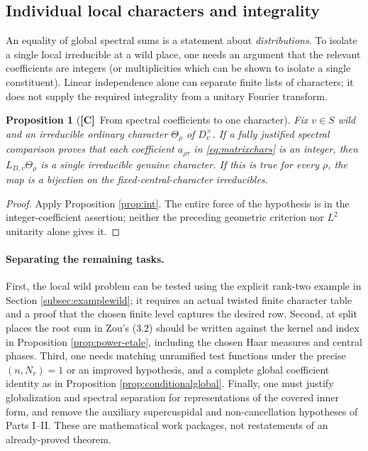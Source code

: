 \documentclass[11pt]{article}
\newcommand{\Ctag}{\textnormal{\textbf{[C]}}}
\theoremstyle{plain}
\newtheorem{proposition}[theorem]{Proposition}
\theoremstyle{definition}
\begin{document}
\subsection{Individual local characters and integrality}
An equality of global spectral sums is a statement about
\emph{distributions}.  To isolate a single local irreducible at a
wild place, one needs an argument that the relevant coefficients
are integers (or multiplicities which can be shown to isolate a
single constituent).  Linear independence alone can separate
finite lists of characters; it does not supply the required
integrality from a unitary Fourier transform.

\begin{proposition}[\Ctag\ From spectral coefficients to one character]
Fix $v\in S$ wild and an irreducible ordinary character
$\Theta_\rho$ of $D_v^\times$.  If a fully justified spectral
comparison proves that each coefficient $a_{\rho\tau}$ in
\eqref{eq:matrixchars} is an integer, then
$L_{D,v}\Theta_\rho$ is a single irreducible genuine character.
If this is true for every $\rho$, the map is a bijection on the
fixed-central-character irreducibles.
\end{proposition}
\begin{proof}
Apply Proposition \ref{prop:int}.  The entire force of the
hypothesis is in the integer-coefficient assertion; neither the
preceding geometric criterion nor $L^2$ unitarity alone gives it.
\end{proof}

\paragraph{Separating the remaining tasks.}
First, the local wild problem can be tested using the explicit
rank-two example in Section \ref{subsec:examplewild}; it requires
an actual twisted finite character table and a proof that the
chosen finite level captures the desired row.  Second, at split
places the root sum in Zou's (3.2) should be written against the
kernel and index in Proposition \ref{prop:power-etale}, including
the chosen Haar measures and central phases.  Third, one needs
matching unramified test functions under the precise
$(n,N_r)=1$ or an improved hypothesis, and a complete global
coefficient identity as in Proposition \ref{prop:conditionalglobal}.
Finally, one must justify globalization and spectral separation
for representations of the covered inner form, and remove the
auxiliary supercuspidal and non-cancellation hypotheses of Parts
I--II.  These are mathematical work packages, not restatements of
an already-proved theorem.
\end{document}
